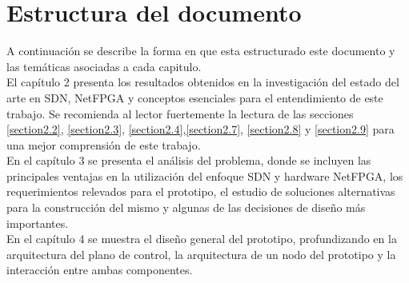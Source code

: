                    


\section{Estructura del documento}

A continuación se describe la forma en que esta estructurado este documento y las temáticas asociadas a cada capitulo.\\

El cap\'itulo 2 presenta los resultados obtenidos en la investigación del estado del arte en SDN, NetFPGA y conceptos esenciales para el entendimiento de este trabajo. Se recomienda al lector fuertemente la lectura de las secciones \ref{section2.2}, \ref{section2.3}, \ref{section2.4},\ref{section2.7}, \ref{section2.8} y \ref{section2.9} para una mejor comprensión de este trabajo.\\

En el cap\'itulo 3 se presenta el análisis del problema, donde se incluyen las principales ventajas en la utilización del enfoque SDN y hardware NetFPGA, los requerimientos relevados para el prototipo, el estudio de soluciones alternativas para la construcción del mismo y algunas de las decisiones de diseño m\'as importantes.\\

En el cap\'itulo 4 se muestra el diseño general del prototipo, profundizando en la arquitectura del plano de control, la arquitectura de un nodo del prototipo y la interacción entre ambas componentes.\\

